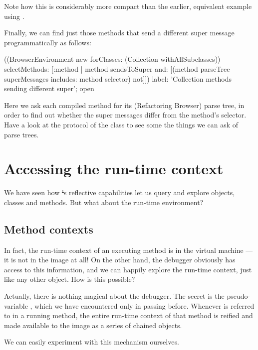 \documentclass[a4paper,10pt,twoside]{book}
\begin{document}
Note how this is considerably more compact than the earlier, equivalent example using .

Finally, we can find just those methods that send a different super message programmatically as follows:
\begin{code}{}
((BrowserEnvironment new forClasses: (Collection withAllSubclasses))
	selectMethods: [:method | 
		method sendsToSuper
		and: [(method parseTree superMessages includes: method selector) not]])
	label: 'Collection methods sending different super';
	open
\end{code}
Here we ask each compiled method for its (Refactoring Browser) parse tree, in order to find out whether the super messages differ from the method's selector.
Have a look at the  protocol of the class  to see some the things we can ask of parse trees.

\section{Accessing the run-time context}

We have seen how \st's reflective capabilities let us query and explore objects, classes and methods.  But what about the run-time environment?

\subsection{Method contexts}

In fact, the run-time context of an executing method is in the virtual machine --- it is not in the image at all!
On the other hand, the debugger obviously has access to this information, and we can happily explore the run-time context, just like any other object.
How is this possible?

Actually, there is nothing magical about the debugger.
The secret is the pseudo-variable , which we have encountered only in passing before.
Whenever  is referred to in a running method, the entire run-time context of that method is reified and made available to the image as a series of chained  objects.

We can easily experiment with this mechanism ourselves.

\end{document}
